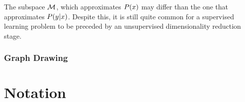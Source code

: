 \begin{remark}
The subspace $\mathcal{M}$, which approximates $P(x)$ may differ than the one that approximates $P(y|x)$. Despite this, it is still quite common for a supervised learning problem to be preceded by an unsupervised dimensionality reduction stage.
\end{remark}


\subsection{Graph Drawing}












\chapter{Notation}
\label{apx:notation}

